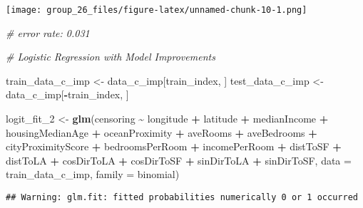 \documentclass[
]{article}
\newenvironment{Shaded}{\begin{snugshade}}{\end{snugshade}}
\newcommand{\AttributeTok}[1]{\textcolor[rgb]{0.13,0.29,0.53}{#1}}
\newcommand{\CommentTok}[1]{\textcolor[rgb]{0.56,0.35,0.01}{\textit{#1}}}
\newcommand{\FunctionTok}[1]{\textcolor[rgb]{0.13,0.29,0.53}{\textbf{#1}}}
\newcommand{\NormalTok}[1]{#1}
\newcommand{\OtherTok}[1]{\textcolor[rgb]{0.56,0.35,0.01}{#1}}
\newcommand{\SpecialCharTok}[1]{\textcolor[rgb]{0.81,0.36,0.00}{\textbf{#1}}}
\begin{document}
\texttt{[image: group\_26\_files/figure-latex/unnamed-chunk-10-1.png]}

\begin{Shaded}
\begin{Highlighting}[]
\CommentTok{\# error rate: 0.031}
\end{Highlighting}
\end{Shaded}

\begin{Shaded}
\begin{Highlighting}[]
\CommentTok{\# Logistic Regression with Model Improvements}

\NormalTok{train\_data\_c\_imp }\OtherTok{\textless{}{-}}\NormalTok{ data\_c\_imp[train\_index, ]}
\NormalTok{test\_data\_c\_imp }\OtherTok{\textless{}{-}}\NormalTok{ data\_c\_imp[}\SpecialCharTok{{-}}\NormalTok{train\_index, ] }

\NormalTok{logit\_fit\_2 }\OtherTok{\textless{}{-}} \FunctionTok{glm}\NormalTok{(censoring }\SpecialCharTok{\textasciitilde{}}\NormalTok{ longitude }\SpecialCharTok{+} 
\NormalTok{                   latitude }\SpecialCharTok{+} 
\NormalTok{                   medianIncome }\SpecialCharTok{+} 
\NormalTok{                   housingMedianAge }\SpecialCharTok{+} 
\NormalTok{                   oceanProximity }\SpecialCharTok{+} 
\NormalTok{                   aveRooms }\SpecialCharTok{+} 
\NormalTok{                   aveBedrooms }\SpecialCharTok{+}
\NormalTok{                   cityProximityScore }\SpecialCharTok{+} 
\NormalTok{                   bedroomsPerRoom }\SpecialCharTok{+} 
\NormalTok{                   incomePerRoom }\SpecialCharTok{+}
\NormalTok{                   distToSF }\SpecialCharTok{+}
\NormalTok{                   distToLA }\SpecialCharTok{+}
\NormalTok{                   cosDirToLA }\SpecialCharTok{+}
\NormalTok{                   cosDirToSF }\SpecialCharTok{+}
\NormalTok{                   sinDirToLA }\SpecialCharTok{+}
\NormalTok{                   sinDirToSF,}
                 \AttributeTok{data =}\NormalTok{ train\_data\_c\_imp, }
                 \AttributeTok{family =}\NormalTok{ binomial)}
\end{Highlighting}
\end{Shaded}

\begin{verbatim}
## Warning: glm.fit: fitted probabilities numerically 0 or 1 occurred
\end{verbatim}
\end{document}

